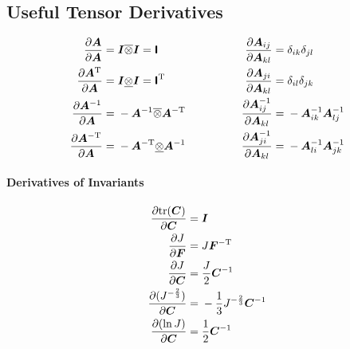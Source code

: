 \documentclass[10pt,letterpaper,oneside]{report}
\newcommand{\ten}[1]{\mbox{\boldmath $#1$}{}}
\newcommand{\tenf}[1]{\mbox{{\sffamily{\bfseries {#1}}}}}
\newcommand{\scas}[1]{\mbox{{\scriptsize{${\rm{#1}}$}}}{}}
\begin{document}
\subsection{Useful Tensor Derivatives}

\begin{align}
\frac{\partial \ten{A}}{\partial \ten{A}} ={}& \ten{I} \overline{\otimes} \ten{I} = \tenf{I}
\qquad & \qquad
\frac{\partial \ten{A}_{ij}}{\partial \ten{A}_{kl}} ={}& \delta_{ik} \delta_{jl}  
\\
\frac{\partial \ten{A}^{\scas{T}}}{\partial \ten{A}} ={}& \ten{I} \underline{\otimes} \ten{I} = \tenf{I}^{\scas{T}} 
\qquad & \qquad
\frac{\partial \ten{A}_{ji}}{\partial \ten{A}_{kl}} ={}& \delta_{il} \delta_{jk}
\\
\frac{\partial \ten{A}^{-1}}{\partial \ten{A}} ={}& - \ten{A}^{-1} \overline{\otimes} \ten{A}^{-\scas{T}} 
\qquad & \qquad
\frac{\partial \ten{A}^{-1}_{ij}}{\partial \ten{A}_{kl}} ={}& - \ten{A}^{-1}_{ik} \ten{A}^{-1}_{lj} 
\\
\frac{\partial \ten{A}^{-\scas{T}}}{\partial \ten{A}} ={}& - \ten{A}^{-\scas{T}} \underline{\otimes} \ten{A}^{-1} 
\qquad & \qquad
\frac{\partial \ten{A}^{-1}_{ji}}{\partial \ten{A}_{kl}} ={}& - \ten{A}^{-1}_{li} \ten{A}^{-1}_{jk} 
\end{align}

\paragraph{Derivatives of Invariants}
\begin{align}
\frac{\partial \mbox{tr} (\ten{C}) }{\partial \ten{C} } ={}& \ten{I} 
\\
\frac{\partial J}{\partial \ten{F}} ={}& J \ten{F}^{-\scas{T}} 
\\
\frac{\partial J}{\partial \ten{C}} ={}& \frac{J}{2} \ten{C}^{-1} 
\\
\frac{\partial (J^{-\frac{2}{3}}) }{\partial \ten{C}} ={}& -\frac{1}{3} J^{-\frac{2}{3}} \ten{C}^{-1} 
\\
\frac{\partial (\ln J) }{\partial \ten{C}} ={}& \frac{1}{2} \ten{C}^{-1}
\end{align}
\end{document}
